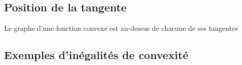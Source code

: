 \documentclass[11pt,a4paper,fleqn,pdftex]{report}
\begin{document}
\subsection{Position de la tangente} %
\label{sub:position_de_la_tangente}
\begin{theorem}[Tangentes]
     Le graphe d'une fonction convexe  est au-dessus de chacune de ses tangentes
\end{theorem}
\subsection{Exemples d'inégalités de convexité} %
\label{sub:exemples_d_inegalites_de_convexite}

\end{document}
